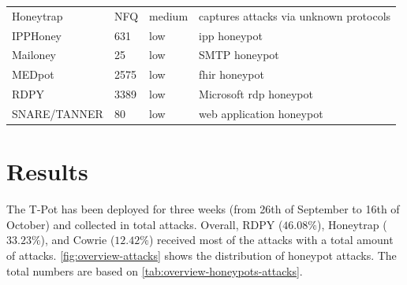 \begin{table}
\begin{tabularx}{\linewidth}{l|XlX}
        Honeytrap \cite{honeytrap2021}            & NFQ                                                                                                         & medium                     & captures attacks via unknown protocols                                               \\
        IPPHoney \cite{ipphoney2021}              & 631                                                                                                         & low                        & \ac{ipp} honeypot                                                                    \\
        Mailoney \cite{mailoney2021}              & 25                                                                                                          & low                        & SMTP honeypot                                                                        \\
        MEDpot \cite{medpot2021}                  & 2575                                                                                                        & low                        & \ac{fhir} honeypot                                                                   \\
        RDPY \cite{rdpy2021}                      & 3389                                                                                                        & low                        & Microsoft \ac{rdp} honeypot                                                          \\
        SNARE/TANNER \cite{snare2021}             & 80                                                                                                          & low                        & web application honeypot                                                             \\
        \bottomrule
    \end{tabularx}
    \label{tab:overview-honeypots}
\end{table}

\section{Results}
\label{sec:honeypots-heicloud}

The T-Pot has been deployed for three weeks (from 26th of September to 16th of October) and collected in total  attacks.
Overall, RDPY ($46.08\%$), Honeytrap ($33.23\%$), and Cowrie ($12.42\%$) received most of the attacks with a total amount of  attacks.
\autoref{fig:overview-attacks} shows the distribution of honeypot attacks.
The total numbers are based on \autoref{tab:overview-honeypots-attacks}.

